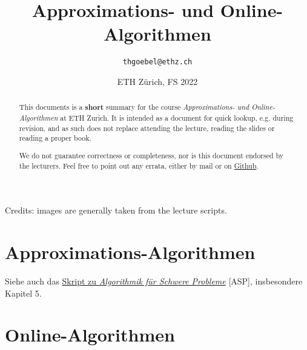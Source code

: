 \documentclass[paper=a4, parskip=half-]{scrartcl}
\title{Approximations- und Online-Algorithmen}
\author{\texttt{thgoebel@ethz.ch}}
\date{ETH Zürich, FS 2022}
\begin{document}
\begin{titlepage}
\maketitle
\vspace{5cm}
\thispagestyle{empty}


\begin{abstract}
This documents is a \textbf{short} summary for the course
\textit{Approximations- und Online-Algorithmen} at ETH Zurich.
It is intended as a document for quick lookup, e.g. during revision,
and as such does not replace attending the lecture, reading the slides or reading a proper book.

We do not guarantee correctness or completeness, nor is this document endorsed by the lecturers.
Feel free to point out any errata, either by mail or on
\href{https://github.com/eth-cs-student-summaries/Approximations-und-Online-Algorithmen}{Github}.
\end{abstract}

\end{titlepage}

\tableofcontents
\vspace{24mm}
\listoffigures

Credits: images are generally taken from the lecture scripts.
\newpage

\part{Approximations-Algorithmen}

Siehe auch das \href{https://github.com/eth-cs-student-summaries/Algorithmik-fuer-Schwere-Probleme/}
{Skript zu \emph{Algorithmik für Schwere Probleme}} [ASP], insbesondere Kapitel 5.


\newpage


\newpage


\newpage


\newpage


\newpage


\part{Online-Algorithmen}


\newpage


\newpage


\newpage


\newpage
\end{document}
